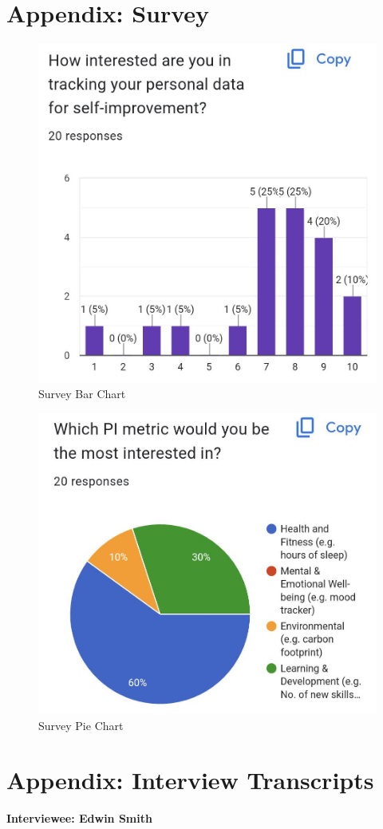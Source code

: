 \documentclass[11pt]{article}
\begin{document}
\section{Appendix: Survey}\label{app:survey}
\begin{figure}[!ht]
\centering
    \includegraphics[width=0.6\linewidth]{survey1.jpg}
\caption{Survey Bar Chart}
\label{fig:survey1}
\end{figure}
\begin{figure}[!ht]
\centering
    \includegraphics[width=0.6\linewidth]{survey2.jpg}
\caption{Survey Pie Chart}
\label{fig:survey2}
\end{figure}

\newpage


\section{Appendix: Interview Transcripts}\label{app:interviews}

\textbf{Interviewee: Edwin Smith}
\end{document}
